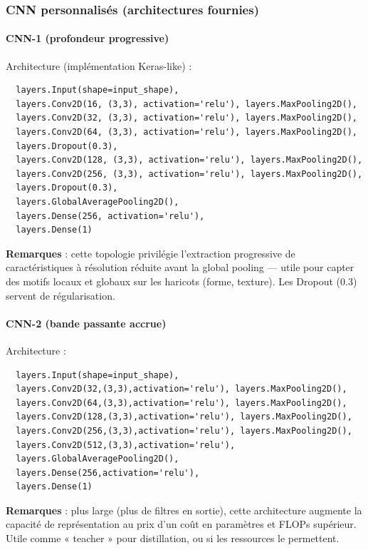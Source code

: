   \subsubsection{CNN personnalisés (architectures fournies)}

  \paragraph{CNN-1 (profondeur progressive)}  
  Architecture (implémentation Keras-like) :
  \begin{verbatim}
  layers.Input(shape=input_shape),
  layers.Conv2D(16, (3,3), activation='relu'), layers.MaxPooling2D(),
  layers.Conv2D(32, (3,3), activation='relu'), layers.MaxPooling2D(),
  layers.Conv2D(64, (3,3), activation='relu'), layers.MaxPooling2D(),
  layers.Dropout(0.3),
  layers.Conv2D(128, (3,3), activation='relu'), layers.MaxPooling2D(),
  layers.Conv2D(256, (3,3), activation='relu'), layers.MaxPooling2D(),
  layers.Dropout(0.3),
  layers.GlobalAveragePooling2D(),
  layers.Dense(256, activation='relu'),
  layers.Dense(1)
  \end{verbatim}

  \noindent \textbf{Remarques} : cette topologie privilégie l’extraction progressive de caractéristiques à résolution réduite avant la global pooling — utile pour capter des motifs locaux et globaux sur les haricots (forme, texture). Les Dropout (0.3) servent de régularisation.

  \paragraph{CNN-2 (bande passante accrue)}  
  Architecture :
  \begin{verbatim}
  layers.Input(shape=input_shape),
  layers.Conv2D(32,(3,3),activation='relu'), layers.MaxPooling2D(),
  layers.Conv2D(64,(3,3),activation='relu'), layers.MaxPooling2D(),
  layers.Conv2D(128,(3,3),activation='relu'), layers.MaxPooling2D(),
  layers.Conv2D(256,(3,3),activation='relu'), layers.MaxPooling2D(),
  layers.Conv2D(512,(3,3),activation='relu'),
  layers.GlobalAveragePooling2D(),
  layers.Dense(256,activation='relu'),
  layers.Dense(1)
  \end{verbatim}

  \noindent \textbf{Remarques} : plus large (plus de filtres en sortie), cette architecture augmente la capacité de représentation au prix d'un coût en paramètres et FLOPs supérieur. Utile comme « teacher » pour distillation, ou si les ressources le permettent.

